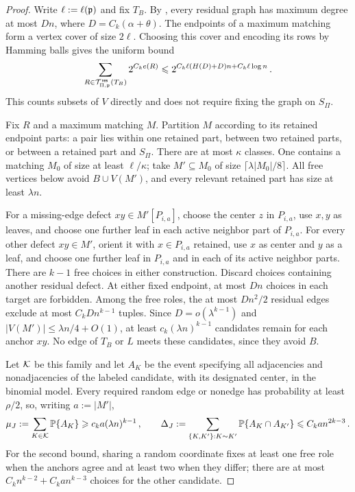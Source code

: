 \begin{proof}
Write $\ell:=\ell({\mathfrak p})$ and fix $T_B$. By , every residual graph has maximum degree at most $Dn$, where $D=C_k(\alpha+\theta)$. The endpoints of a maximum matching form a vertex cover of size $2\ell$. Choosing this cover and encoding its rows by Hamming balls gives the uniform bound
\begin{equation}\label{eqn:residual-graph-count-K1k}
\sum_{R\in{\mathcal T}^{\hspace{0.2mm}\mathsf{res}}_{\Pi,{\mathfrak p}}(T_B)}2^{C_ke(R)}\leqslant2^{C_k\ell(H(D)+D)n+C_k\ell\log n}\,.
\end{equation}
This counts subsets of $V$ directly and does not require fixing the graph on $S_\Pi$.

Fix $R$ and a maximum matching $M$. Partition $M$ according to its retained endpoint parts: a pair lies within one retained part, between two retained parts, or between a retained part and $S_\Pi$. There are at most $\kappa$ classes. One contains a matching $M_0$ of size at least $\ell/\kappa$; take $M'\subseteq M_0$ of size $\lceil\lambda|M_0|/8\rceil$. All free vertices below avoid $B\cup V(M')$, and every relevant retained part has size at least $\lambda n$.

For a missing-edge defect $xy\in M'[P_{i,a}]$, choose the center $z$ in $P_{i,a}$, use $x,y$ as leaves, and choose one further leaf in each active neighbor part of $P_{i,a}$. For every other defect $xy\in M'$, orient it with $x\in P_{i,a}$ retained, use $x$ as center and $y$ as a leaf, and choose one further leaf in $P_{i,a}$ and in each of its active neighbor parts. There are $k-1$ free choices in either construction. Discard choices containing another residual defect. At either fixed endpoint, at most $Dn$ choices in each target are forbidden. Among the free roles, the at most $Dn^2/2$ residual edges exclude at most $C_kDn^{k-1}$ tuples. Since $D=o(\lambda^{k-1})$ and $|V(M')|\leq\lambda n/4+O(1)$, at least $c_k(\lambda n)^{k-1}$ candidates remain for each anchor $xy$. No edge of $T_B$ or $L$ meets these candidates, since they avoid $B$.

Let ${\mathcal K}$ be this family and let $A_K$ be the event specifying all adjacencies and nonadjacencies of the labeled candidate, with its designated center, in the binomial model. Every required random edge or nonedge has probability at least $\rho/2$, so, writing $a:=|M'|$,
$$\mu_J:=\sum_{K\in{\mathcal K}}{\mathbb P}\{A_K\}\geqslant c_k a(\lambda n)^{k-1}\,,\qquad \Delta_J:=\sum_{\{K,K'\}:K\sim K'}{\mathbb P}\{A_K\cap A_{K'}\}\leqslant C_k a n^{2k-3}\,.$$
For the second bound, sharing a random coordinate fixes at least one free role when the anchors agree and at least two when they differ; there are at most $C_kn^{k-2}+C_ka n^{k-3}$ choices for the other candidate.


\end{proof}

